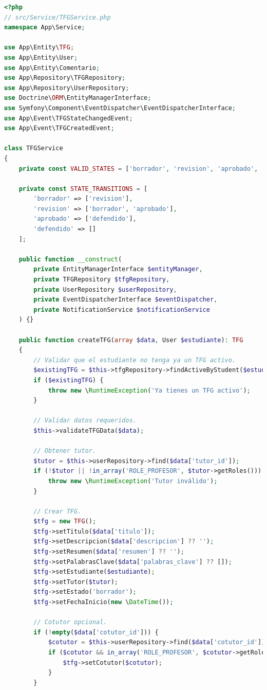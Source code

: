 \documentclass[12pt,a4paper,oneside]{report}
\begin{document}
\begin{lstlisting}[language=PHP]
<?php
// src/Service/TFGService.php
namespace App\Service;

use App\Entity\TFG;
use App\Entity\User;
use App\Entity\Comentario;
use App\Repository\TFGRepository;
use App\Repository\UserRepository;
use Doctrine\ORM\EntityManagerInterface;
use Symfony\Component\EventDispatcher\EventDispatcherInterface;
use App\Event\TFGStateChangedEvent;
use App\Event\TFGCreatedEvent;

class TFGService
{
    private const VALID_STATES = ['borrador', 'revision', 'aprobado', 'defendido'];
    
    private const STATE_TRANSITIONS = [
        'borrador' => ['revision'],
        'revision' => ['borrador', 'aprobado'], 
        'aprobado' => ['defendido'],
        'defendido' => []
    ];

    public function __construct(
        private EntityManagerInterface $entityManager,
        private TFGRepository $tfgRepository,
        private UserRepository $userRepository,
        private EventDispatcherInterface $eventDispatcher,
        private NotificationService $notificationService
    ) {}

    public function createTFG(array $data, User $estudiante): TFG
    {
        // Validar que el estudiante no tenga ya un TFG activo.
        $existingTFG = $this->tfgRepository->findActiveByStudent($estudiante);
        if ($existingTFG) {
            throw new \RuntimeException('Ya tienes un TFG activo');
        }

        // Validar datos requeridos.
        $this->validateTFGData($data);

        // Obtener tutor.
        $tutor = $this->userRepository->find($data['tutor_id']);
        if (!$tutor || !in_array('ROLE_PROFESOR', $tutor->getRoles())) {
            throw new \RuntimeException('Tutor inválido');
        }

        // Crear TFG.
        $tfg = new TFG();
        $tfg->setTitulo($data['titulo']);
        $tfg->setDescripcion($data['descripcion'] ?? '');
        $tfg->setResumen($data['resumen'] ?? '');
        $tfg->setPalabrasClave($data['palabras_clave'] ?? []);
        $tfg->setEstudiante($estudiante);
        $tfg->setTutor($tutor);
        $tfg->setEstado('borrador');
        $tfg->setFechaInicio(new \DateTime());

        // Cotutor opcional.
        if (!empty($data['cotutor_id'])) {
            $cotutor = $this->userRepository->find($data['cotutor_id']);
            if ($cotutor && in_array('ROLE_PROFESOR', $cotutor->getRoles())) {
                $tfg->setCotutor($cotutor);
            }
        }


\end{lstlisting}
\end{document}

